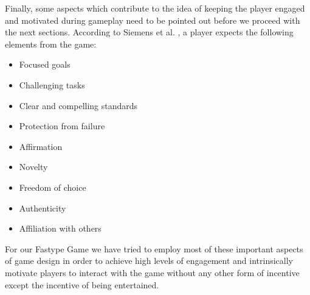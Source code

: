 Finally, some aspects which contribute to the idea of keeping the player engaged and motivated during gameplay need to be pointed out before we proceed with the next sections. According to Siemens et al. \cite{49}, a player expects the following elements from the game:
\begin{itemize}
    \item Focused goals
    \item Challenging tasks
    \item Clear and compelling standards
    \item Protection from failure
    \item Affirmation
    \item Novelty
    \item Freedom of choice
    \item Authenticity
    \item Affiliation with others
\end{itemize}
For our Fastype Game we have tried to employ most of these important aspects of game design in order to achieve high levels of engagement and intrinsically motivate players to interact with the game without any other form of incentive except the incentive of being entertained.